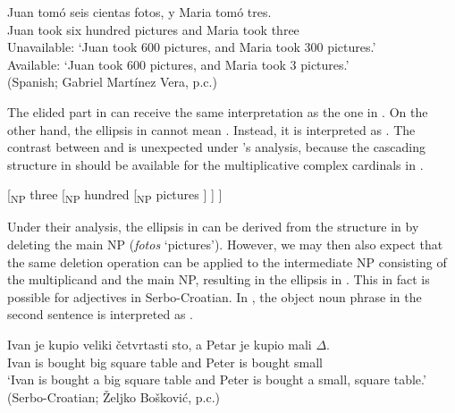 \documentclass[output=paper]{langscibook}
\begin{document}
\ex\label{tat:elipc}
\gll Juan tomó seis cientas fotos, y Maria tomó tres.\\  
    Juan took six hundred pictures and Maria took three\\ 
\glt Unavailable: `Juan took 600 pictures, and Maria took 300 pictures.'\\
Available: `Juan took 600 pictures, and Maria took 3 pictures.'\\
\hfill (Spanish; Gabriel Martínez Vera, p.c.)
\z
\z

\noindent The elided part in  can receive the same interpretation as the one in . On the other hand, the ellipsis in  cannot mean . Instead, it is interpreted as . The contrast between  and  is unexpected under \citeauthor{IoninMatushansky2018}'s analysis, because the cascading structure in  should be available for the multiplicative complex cardinals in .

\ea\label{tat:ex:cas2}
{[}\textsubscript{NP} three [\textsubscript{NP} hundred [\textsubscript{NP} pictures ] ] ]\hfill\citep{IoninMatushansky2018}
\z

\noindent Under their analysis, the ellipsis in  can be derived from the structure in  by deleting the main NP (\textit{fotos} `pictures'). However, we may then also expect that the same deletion operation can be applied to the intermediate NP consisting of the multiplicand and the main NP, resulting in the ellipsis in . This in fact is possible for adjectives in Serbo-Croatian. In , the object noun phrase in the second sentence is interpreted as .  

\ea\label{tat:inter.ellipsis}
\gll Ivan je kupio veliki \v{c}etvrtasti sto, a Petar je kupio mali $\Delta$.\\
   Ivan is bought big square table and Peter is bought small {}\\
\glt `Ivan is bought a big square table and Peter is bought a small, square table.' \hfill(Serbo-Croatian; Željko Bošković, p.c.)
\z
\end{document}
